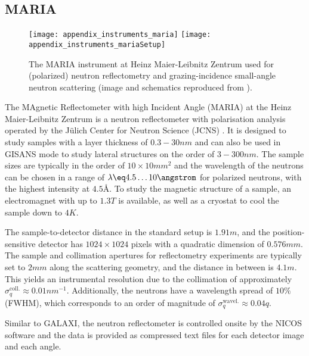 \documentclass[\main/dresen_thesis.tex]{subfiles}
\begin{document}
  \subsection{MARIA}\label{ch:lss:maria}
    \begin{figure}[ht]
      \centering
      \texttt{[image: appendix\_instruments\_maria]}
      \texttt{[image: appendix\_instruments\_mariaSetup]}
      \caption{\label{fig:lss:maria}The MARIA instrument at Heinz Maier-Leibnitz Zentrum used for (polarized) neutron reflectometry and grazing-incidence small-angle neutron scattering (image and schematics reproduced from \cite{Heinz_2015_Maria}).}
    \end{figure}

    The MAgnetic Reflectometer with high Incident Angle (MARIA) at the Heinz Maier-Leibnitz Zentrum is a neutron reflectometer with polarisation analysis operated by the J\"ulich Center for Neutron Science (JCNS) \cite{Heinz_2015_Maria}.
    It is designed to study samples with a layer thickness of $0.3 - 30 \unit{nm}$ and can also be used in GISANS mode to study lateral structures on the order of $3 - 300 \unit{nm}$.
    The sample sizes are typically in the order of $10 \times 10 \unit{mm^2}$ and the wavelength of the neutrons can be chosen in a range of $\lambda \eq 4.5 \ldots 10 \angstrom$ for polarized neutrons, with the highest intensity at $4.5 \unit{\angstrom}$.
    To study the magnetic structure of a sample, an electromagnet with up to $1.3 \unit{T}$ is available, as well as a cryostat to cool the sample down to $4 \unit{K}$.

    The sample-to-detector distance in the standard setup is $1.91 \unit{m}$, and the position-sensitive detector has $1024 \times 1024$ pixels with a quadratic dimension of $0.576 \unit{mm}$.
    The sample and collimation apertures for reflectometry experiments are typically set to $2 \unit{mm}$ along the scattering geometry, and the distance in between is $4.1 \unit{m}$.
    This yields an instrumental resolution due to the collimation of approximately $\sigma_q^\mathrm{coll.} \approx 0.01\unit{nm}^{-1}$.
    Additionally, the neutrons have a wavelength spread of $10 \unit{\%}$ (FWHM), which corresponds to an order of magnitude of $\sigma_q^\mathrm{wavel.} \approx 0.04 q$.

    Similar to GALAXI, the neutron reflectometer is controlled onsite by the NICOS software and the data is provided as compressed text files for each detector image and each angle.
\end{document}
